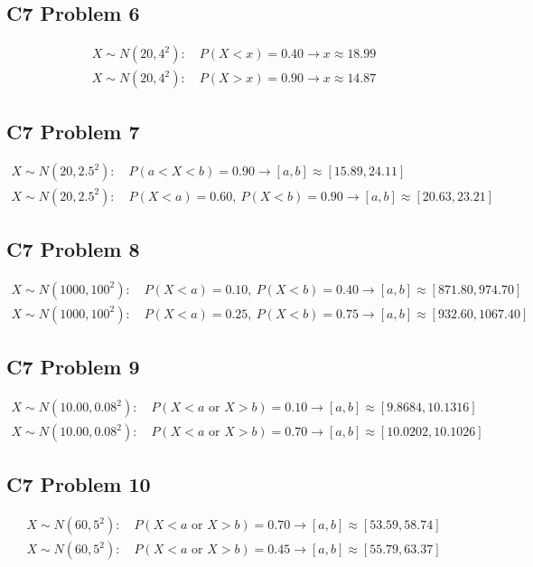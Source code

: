	\subsection{C7 Problem 6}
	\[
	\begin{array}{l}
	X\sim N(20,4^2):\quad P(X<x)=0.40 \longrightarrow x\approx 18.99\\
	X\sim N(20,4^2):\quad P(X>x)=0.90 \longrightarrow x\approx 14.87
	\end{array}
	\]

	\subsection{C7 Problem 7}
	\[
	\begin{array}{l}
	X\sim N(20,2.5^2):\quad P(a<X<b)=0.90 \longrightarrow [a,b]\approx[15.89,24.11]\\
	X\sim N(20,2.5^2):\quad P(X<a)=0.60,\ P(X<b)=0.90 \longrightarrow [a,b]\approx[20.63,23.21]
	\end{array}
	\]

	\subsection{C7 Problem 8}
	\[
	\begin{array}{l}
	X\sim N(1000,100^2):\quad P(X<a)=0.10,\ P(X<b)=0.40 \longrightarrow [a,b]\approx[871.80,974.70]\\
	X\sim N(1000,100^2):\quad P(X<a)=0.25,\ P(X<b)=0.75 \longrightarrow [a,b]\approx[932.60,1067.40]
	\end{array}
	\]

	\subsection{C7 Problem 9}
	\[
	\begin{array}{l}
	X\sim N(10.00,0.08^2):\quad P(X<a\text{ or }X>b)=0.10 \longrightarrow [a,b]\approx[9.8684,10.1316]\\
	X\sim N(10.00,0.08^2):\quad P(X<a\text{ or }X>b)=0.70 \longrightarrow [a,b]\approx[10.0202,10.1026]
	\end{array}
	\]

	\subsection{C7 Problem 10}
	\[
	\begin{array}{l}
	X\sim N(60,5^2):\quad P(X<a\text{ or }X>b)=0.70 \longrightarrow [a,b]\approx[53.59,58.74]\\
	X\sim N(60,5^2):\quad P(X<a\text{ or }X>b)=0.45 \longrightarrow [a,b]\approx[55.79,63.37]
	\end{array}
	\]


